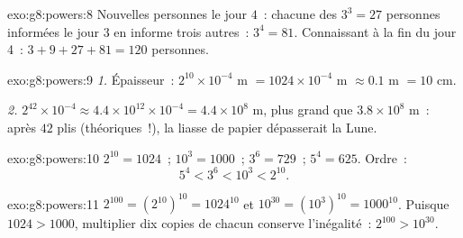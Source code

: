 \begin{solution}{exo:g8:powers:8}
Nouvelles personnes le jour $4$~: chacune des $3^3 = 27$ personnes
informées le jour 3 en informe trois autres~: $3^4 = 81$. Connaissant
à la fin du jour 4~: $3 + 9 + 27 + 81 = 120$ personnes.
\end{solution}

\begin{solution}{exo:g8:powers:9}
\emph{1.} Épaisseur~: $2^{10} \times 10^{-4}$ m
$= 1024 \times 10^{-4}$ m $\approx 0.1$ m $= 10$ cm.

\emph{2.} $2^{42} \times 10^{-4} \approx 4.4 \times 10^{12} \times
10^{-4} = 4.4 \times 10^8$ m, plus grand que $3.8 \times 10^8$ m~:
après $42$ plis (théoriques~!), la liasse de papier dépasserait la
Lune.
\end{solution}

\begin{solution}{exo:g8:powers:10}
$2^{10} = 1024$~; $10^3 = 1000$~; $3^6 = 729$~; $5^4 = 625$. Ordre~:
\[
5^4 < 3^6 < 10^3 < 2^{10} .
\]
\end{solution}

\begin{solution}{exo:g8:powers:11}
$2^{100} = \left(2^{10}\right)^{10} = 1024^{10}$ et
$10^{30} = \left(10^3\right)^{10} = 1000^{10}$. Puisque $1024 > 1000$,
multiplier dix copies de chacun conserve l'inégalité~:
$2^{100} > 10^{30}$.
\end{solution}

